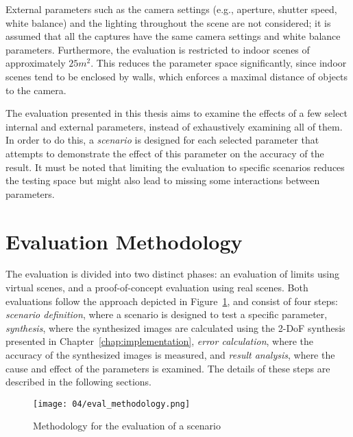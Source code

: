 External parameters such as the camera settings (e.g., aperture, shutter speed, white balance) and the lighting throughout the scene are not considered; it is assumed that all the captures have the same camera settings and white balance parameters. Furthermore, the evaluation is restricted to indoor scenes of approximately $25m^2$. This reduces the parameter space significantly, since indoor scenes tend to be enclosed by walls, which enforces a maximal distance of objects to the camera.

The evaluation presented in this thesis aims to examine the effects of a few select internal and external parameters, instead of exhaustively examining all of them. In order to do this, a \emph{scenario} is designed for each selected parameter that attempts to demonstrate the effect of this parameter on the accuracy of the result. It must be noted that limiting the evaluation to specific scenarios reduces the testing space but might also lead to missing some interactions between parameters.


\section{Evaluation Methodology} \label{sec:eval_methodology}
The evaluation is divided into two distinct phases: an evaluation of limits using virtual scenes, and a proof-of-concept evaluation using real scenes. Both evaluations follow the approach depicted in Figure~\ref{fig:eval-methodology}, and consist of four steps: \emph{scenario definition}, where a scenario is designed to test a specific parameter, \emph{synthesis}, where the synthesized images are calculated using the 2-DoF synthesis presented in Chapter~\ref{chap:implementation}, \emph{error calculation}, where the accuracy of the synthesized images is measured, and \emph{result analysis}, where the cause and effect of the parameters is examined. The details of these steps are described in the following sections.

\begin{figure}
		\centering
		\texttt{[image: 04/eval\_methodology.png]}
		\caption{Methodology for the evaluation of a scenario}
		\label{fig:eval-methodology}
\end{figure}

